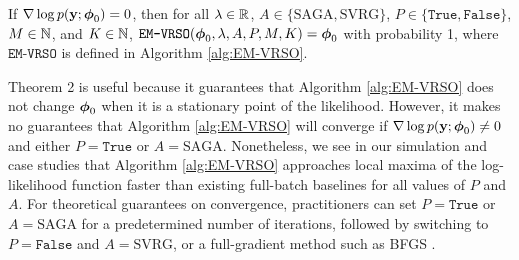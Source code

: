 \begin{theorem}
    If $\nabla \log p(\mathbf{y};\boldsymbol{\phi}_0) = 0$, then for all $\lambda \in \mathbb{R}$, $A \in \{\text{SAGA}, \text{SVRG}\}$, $P \in \{\texttt{True},\texttt{False}\}$, $M \in \mathbb{N}$, and $K \in \mathbb{N}$, $\texttt{EM-VRSO}(\boldsymbol{\phi}_0, \lambda, A, P, M, K) = \boldsymbol{\phi}_0$ with probability 1, where $\texttt{EM-VRSO}$ is defined in Algorithm \ref{alg:EM-VRSO}.
\end{theorem}

Theorem 2 is useful because it guarantees that Algorithm \ref{alg:EM-VRSO} does not change $\boldsymbol{\phi}_0$ when it is a stationary point of the likelihood. However, it makes no guarantees that Algorithm \ref{alg:EM-VRSO} will converge if $\nabla \log p(\mathbf{y};\boldsymbol{\phi}_0) \neq 0$ and either $P = \texttt{True}$ or $A = \text{SAGA}$. Nonetheless, we see in our simulation and case studies that Algorithm \ref{alg:EM-VRSO} approaches local maxima of the log-likelihood function faster than existing full-batch baselines for all values of $P$ and $A$. For theoretical guarantees on convergence, practitioners can set $P = \texttt{True}$ or $A = \text{SAGA}$ for a predetermined number of iterations, followed by switching to $P = \texttt{False}$ and $A = \text{SVRG}$, or a full-gradient method such as BFGS \citep{Fletcher:2000}.